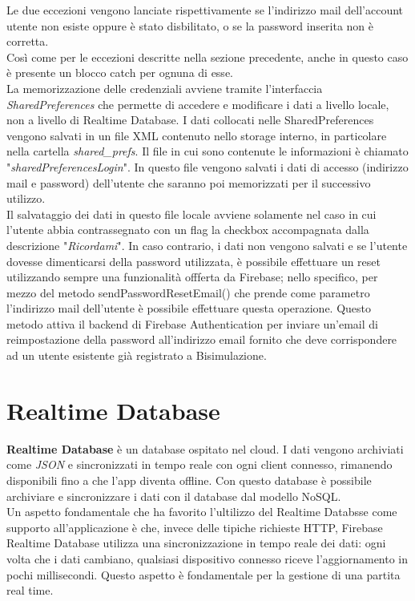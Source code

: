 \documentclass[a4paper,11pt,twoside,openright]{report}
\begin{document}
Le due eccezioni vengono lanciate rispettivamente se l'indirizzo mail dell'account utente non esiste oppure è stato disbilitato, o se la password inserita non è corretta.\\
Così come per le eccezioni descritte nella sezione precedente, anche in questo caso è presente un blocco catch per ognuna di esse.\\
La memorizzazione delle credenziali avviene tramite l'interfaccia \textit{SharedPreferences}\cite{6} che permette di accedere e modificare i dati a livello locale, non a livello di Realtime Database.
I dati collocati nelle SharedPreferences vengono salvati in un file XML contenuto nello storage interno, in particolare nella cartella \textit{shared\_prefs}. Il file in cui sono contenute le informazioni è chiamato "\textit{sharedPreferencesLogin}". In questo file vengono salvati i dati di accesso (indirizzo mail e password) dell'utente che saranno poi memorizzati per il successivo utilizzo.\\
Il salvataggio dei dati in questo file locale avviene solamente nel caso in cui l'utente abbia contrassegnato con un flag la checkbox accompagnata dalla descrizione "\textit{Ricordami}". In caso contrario, i dati non vengono salvati e se l'utente dovesse dimenticarsi della password utilizzata, è possibile effettuare un reset utilizzando sempre una funzionalità offferta da Firebase; nello specifico, per mezzo del metodo sendPasswordResetEmail() che prende come parametro l'indirizzo mail dell'utente è possibile effettuare questa operazione. Questo metodo attiva il backend di Firebase Authentication per inviare un'email di reimpostazione della password all'indirizzo email fornito che deve corrispondere ad un utente esistente già registrato a Bisimulazione.

\section{Realtime Database}
\textbf{Realtime Database} è un database ospitato nel cloud. I dati vengono archiviati come \textit{JSON} e sincronizzati in tempo reale con ogni client connesso, rimanendo disponibili fino a che l'app diventa offline. Con questo database è possibile archiviare e sincronizzare i dati con il database dal modello NoSQL\cite{7}.\\
Un aspetto fondamentale che ha favorito l'ultilizzo del Realtime Databsse come supporto all'applicazione è che, invece delle tipiche richieste HTTP, Firebase Realtime Database utilizza una sincronizzazione in tempo reale dei dati: ogni volta che i dati cambiano, qualsiasi dispositivo connesso riceve l'aggiornamento in pochi millisecondi. Questo aspetto è fondamentale per la gestione di una partita real time.\\
\end{document}
